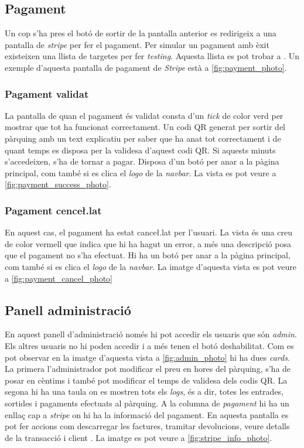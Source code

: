 \subsection{Pagament}
Un cop s'ha pres el botó de sortir de la pantalla anterior es redirigeix a una pantalla de \emph{stripe}
per fer el pagament. Per simular un pagament amb èxit existeixen una llista de targetes
per fer \emph{testing}. Aquesta llista es pot trobar a \autocite{list_cards}.
Un exemple d'aquesta pantalla de pagament de \emph{Stripe} \autocite{stripe} està a \autoref{fig:payment_photo}.

\subsubsection{Pagament validat}
La pantalla de quan el pagament és validat consta d'un \emph{tick} de color verd
per mostrar que tot ha funcionat correctament. Un codi QR generat per sortir del pàrquing amb
un text explicatiu per saber que ha anat tot correctament i de quant temps es disposa
per la validesa d'aquest codi QR. Si aquests minuts s'accedeixen, s'ha de tornar a pagar.
Disposa d'un botó per anar a la pàgina principal, com també si es clica el \emph{logo} de la
\emph{navbar}. La vista es pot veure a \autoref{fig:payment_success_photo}.

\subsubsection{Pagament cence\l.lat}
En aquest cas, el pagament ha estat cance\l.lat per l'usuari. La vista és
una creu de color vermell que indica que hi ha hagut un error, a més una descripció posa que el pagament
no s'ha efectuat. Hi ha un botó per anar a la pàgina principal, com també si es clica el \emph{logo} de la
\emph{navbar}. La imatge d'aquesta vista es pot veure a \autoref{fig:payment_cancel_photo}

\subsection{Panell administració}
\label{sssec:index}
En aquest panell d'administració només hi pot accedir els usuaris que són \emph{admin}.
Els altres usuaris no hi poden accedir i a més tenen el botó deshabilitat.
Com es pot observar en la imatge d'aquesta vista a \autoref{fig:admin_photo} hi ha
dues \emph{cards}. La primera l'administrador pot modificar el preu en hores del
pàrquing, s'ha de posar en cèntims i també pot modificar el temps de validesa dels
codis QR. La segona hi ha una taula on es mostren tots els \emph{logs}, és a dir, totes
les entrades, sortides i pagaments efectuats al pàrquing. A la columna de \emph{pagament}
hi ha un enllaç cap a \emph{stripe} on hi ha la informació del pagament.
En aquesta pantalla es pot fer accions com descarregar les factures, tramitar devolucions,
veure detalls de la transacció i client \autocite{stripe}.
La imatge es pot veure a \autoref{fig:stripe_info_photo}.

